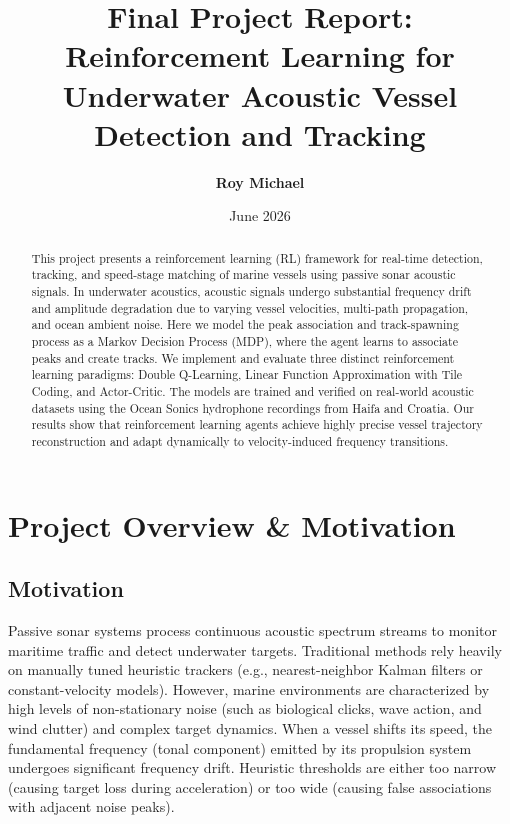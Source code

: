 \documentclass[12pt,a4paper]{article}
\title{\textbf{Final Project Report: Reinforcement Learning for\\Underwater Acoustic Vessel Detection and Tracking}}
\author{\textbf{Roy Michael}}
\date{June 2026}
\begin{document}
\maketitle

\begin{abstract}
This project presents a reinforcement learning (RL) framework for real-time detection, tracking, and speed-stage matching of marine vessels using passive sonar acoustic signals. In underwater acoustics, acoustic signals undergo substantial frequency drift and amplitude degradation due to varying vessel velocities, multi-path propagation, and ocean ambient noise. Here we model the peak association and track-spawning process as a Markov Decision Process (MDP), where the agent learns to associate peaks and create tracks. We implement and evaluate three distinct reinforcement learning paradigms: Double Q-Learning, Linear Function Approximation with Tile Coding, and Actor-Critic. The models are trained and verified on real-world acoustic datasets using the Ocean Sonics hydrophone recordings from Haifa and Croatia. Our results show that reinforcement learning agents achieve highly precise vessel trajectory reconstruction and adapt dynamically to velocity-induced frequency transitions.
\end{abstract}

\newpage
\tableofcontents
\newpage

\section{Project Overview \& Motivation}

\subsection{Motivation}
Passive sonar systems process continuous acoustic spectrum streams to monitor maritime traffic and detect underwater targets. Traditional methods rely heavily on manually tuned heuristic trackers (e.g., nearest-neighbor Kalman filters or constant-velocity models). However, marine environments are characterized by high levels of non-stationary noise (such as biological clicks, wave action, and wind clutter) and complex target dynamics. When a vessel shifts its speed, the fundamental frequency (tonal component) emitted by its propulsion system undergoes significant frequency drift. Heuristic thresholds are either too narrow (causing target loss during acceleration) or too wide (causing false associations with adjacent noise peaks). 
\end{document}
